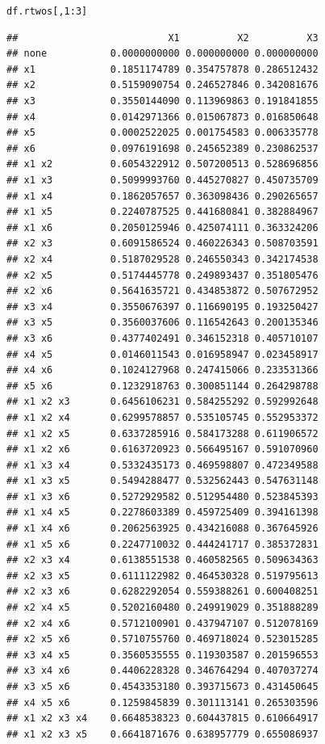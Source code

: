 \documentclass[11pt,a4paper,twoside]{book}\usepackage[]{graphicx}\usepackage[]{color}
\makeatletter
\newcommand{\hlnum}[1]{\textcolor[rgb]{0.686,0.059,0.569}{#1}}%
\newcommand{\hlopt}[1]{\textcolor[rgb]{0,0,0}{#1}}%
\newcommand{\hlstd}[1]{\textcolor[rgb]{0.345,0.345,0.345}{#1}}%
\newenvironment{kframe}{%
 \def\at@end@of@kframe{}%
 \ifinner\ifhmode%
  \def\at@end@of@kframe{\end{minipage}}%
  \begin{minipage}{\columnwidth}%
 \fi\fi%
 \def\FrameCommand##1{\hskip\@totalleftmargin \hskip-\fboxsep
 \colorbox{shadecolor}{##1}\hskip-\fboxsep
     \hskip-\linewidth \hskip-\@totalleftmargin \hskip\columnwidth}%
 \MakeFramed {\advance\hsize-\width
   \@totalleftmargin\z@ \linewidth\hsize
   \@setminipage}}%
 {\par\unskip\endMakeFramed%
 \at@end@of@kframe}
\newenvironment{knitrout}{}{} %
\makeatother
\begin{document}
\begin{knitrout}
\begin{kframe}
\begin{alltt}
\hlstd{df.rtwos[,}\hlnum{1}\hlopt{:}\hlnum{3}\hlstd{]}
\end{alltt}
\begin{verbatim}
##                          X1          X2          X3
## none           0.0000000000 0.000000000 0.000000000
## x1             0.1851174789 0.354757878 0.286512432
## x2             0.5159090754 0.246527846 0.342081676
## x3             0.3550144090 0.113969863 0.191841855
## x4             0.0142971366 0.015067873 0.016850648
## x5             0.0002522025 0.001754583 0.006335778
## x6             0.0976191698 0.245652389 0.230862537
## x1 x2          0.6054322912 0.507200513 0.528696856
## x1 x3          0.5099993760 0.445270827 0.450735709
## x1 x4          0.1862057657 0.363098436 0.290265657
## x1 x5          0.2240787525 0.441680841 0.382884967
## x1 x6          0.2050125946 0.425074111 0.363324206
## x2 x3          0.6091586524 0.460226343 0.508703591
## x2 x4          0.5187029528 0.246550343 0.342174538
## x2 x5          0.5174445778 0.249893437 0.351805476
## x2 x6          0.5641635721 0.434853872 0.507672952
## x3 x4          0.3550676397 0.116690195 0.193250427
## x3 x5          0.3560037606 0.116542643 0.200135346
## x3 x6          0.4377402491 0.346152318 0.405710107
## x4 x5          0.0146011543 0.016958947 0.023458917
## x4 x6          0.1024127968 0.247415066 0.233531366
## x5 x6          0.1232918763 0.300851144 0.264298788
## x1 x2 x3       0.6456106231 0.584255292 0.592992648
## x1 x2 x4       0.6299578857 0.535105745 0.552953372
## x1 x2 x5       0.6337285916 0.584173288 0.611906572
## x1 x2 x6       0.6163720923 0.566495167 0.591070960
## x1 x3 x4       0.5332435173 0.469598807 0.472349588
## x1 x3 x5       0.5494288477 0.532562443 0.547631148
## x1 x3 x6       0.5272929582 0.512954480 0.523845393
## x1 x4 x5       0.2278603389 0.459725409 0.394161398
## x1 x4 x6       0.2062563925 0.434216088 0.367645926
## x1 x5 x6       0.2247710032 0.444241717 0.385372831
## x2 x3 x4       0.6138551538 0.460582565 0.509634363
## x2 x3 x5       0.6111122982 0.464530328 0.519795613
## x2 x3 x6       0.6282292054 0.559388261 0.600408251
## x2 x4 x5       0.5202160480 0.249919029 0.351888289
## x2 x4 x6       0.5712100901 0.437947107 0.512078169
## x2 x5 x6       0.5710755760 0.469718024 0.523015285
## x3 x4 x5       0.3560535555 0.119303587 0.201596553
## x3 x4 x6       0.4406228328 0.346764294 0.407037274
## x3 x5 x6       0.4543353180 0.393715673 0.431450645
## x4 x5 x6       0.1259845839 0.301113141 0.265303596
## x1 x2 x3 x4    0.6648538323 0.604437815 0.610664917
## x1 x2 x3 x5    0.6641871676 0.638957779 0.655086937

\end{verbatim}
\end{kframe}
\end{knitrout}
\end{document}
